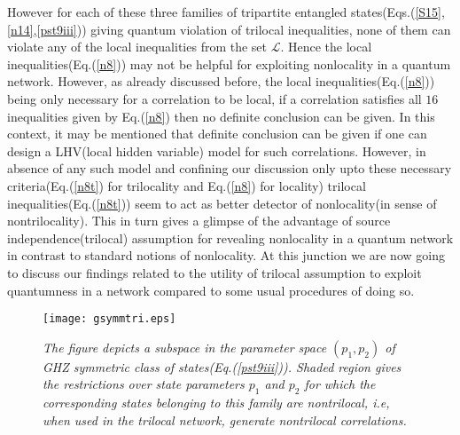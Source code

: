 \documentclass[pra,10pt,twocolumn,superscriptaddress,floatfix,showpacs]{revtex4-1}
\begin{document}
However for each of these three families of tripartite entangled states(Eqs.(\ref{S15},\ref{n14},\ref{pst9iii})) giving quantum violation of trilocal inequalities, none of them can violate any of the local inequalities from the set $\mathcal{L}$. Hence the local inequalities(Eq.(\ref{n8})) may not be helpful for exploiting nonlocality in a quantum network. However, as already discussed before, the local inequalities(Eq.(\ref{n8})) being only necessary for a correlation to be local, if a correlation satisfies all $16$ inequalities given by Eq.(\ref{n8}) then no definite conclusion can be given. In this context, it may be mentioned that definite conclusion can be given if one can design a LHV(local hidden variable) model for such correlations. However, in absence of any such model and confining our discussion only upto these necessary criteria(Eq.(\ref{n8t}) for trilocality and Eq.(\ref{n8}) for locality) trilocal inequalities(Eq.(\ref{n8t})) seem to act as better detector of nonlocality(in sense of nontrilocality). This in turn gives a glimpse of the advantage of source independence(trilocal) assumption for revealing nonlocality in a quantum network in contrast to standard notions of nonlocality. At this junction we are now going  to discuss our findings related to the utility of trilocal assumption to exploit quantumness in a network compared to some usual procedures of doing so.\\
\begin{center}
\begin{figure}
\texttt{[image: gsymmtri.eps]}
\caption{\emph{The figure depicts a subspace in the parameter space $(p_1,p_2)$ of GHZ symmetric class of states(Eq.(\ref{pst9iii})). Shaded region gives the restrictions over state parameters $p_1$ and $p_2$ for which the corresponding states belonging to this family are nontrilocal, i.e, when used in the trilocal network, generate nontrilocal correlations. }}
\end{figure}
\end{center}
\end{document}
